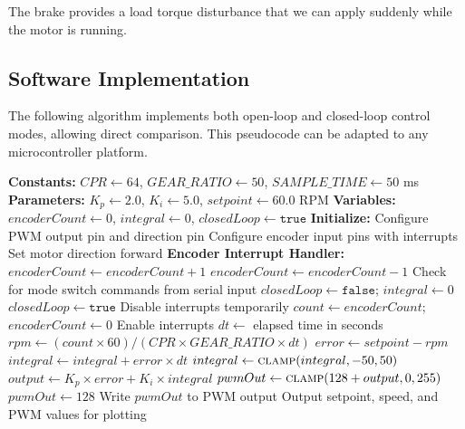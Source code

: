 The brake provides a load torque disturbance that we can apply suddenly while the motor is running.

\subsection{Software Implementation}

The following algorithm implements both open-loop and closed-loop control modes, allowing direct comparison. This pseudocode can be adapted to any microcontroller platform.

\begin{algorithm}
\caption{Motor Speed Control with Disturbance Rejection}
\begin{algorithmic}[1]
\State \textbf{Constants:} $CPR \gets 64$, $GEAR\_RATIO \gets 50$, $SAMPLE\_TIME \gets 50$ ms
\State \textbf{Parameters:} $K_p \gets 2.0$, $K_i \gets 5.0$, $setpoint \gets 60.0$ RPM
\State \textbf{Variables:} $encoderCount \gets 0$, $integral \gets 0$, $closedLoop \gets \texttt{true}$
\State
\State \textbf{Initialize:}
\State \hspace{1em} Configure PWM output pin and direction pin
\State \hspace{1em} Configure encoder input pins with interrupts
\State \hspace{1em} Set motor direction forward
\State
\State \textbf{Encoder Interrupt Handler:}
    \State $encoderCount \gets encoderCount + 1$
\Else
    \State $encoderCount \gets encoderCount - 1$
\EndIf
\State
{}
    \State Check for mode switch commands from serial input
        \State $closedLoop \gets \texttt{false}$; $integral \gets 0$
        \State $closedLoop \gets \texttt{true}$
    \EndIf
    \State
        \State Disable interrupts temporarily
        \State $count \gets encoderCount$; $encoderCount \gets 0$
        \State Enable interrupts
        \State $dt \gets$ elapsed time in seconds
        \State $rpm \gets (count \times 60) / (CPR \times GEAR\_RATIO \times dt)$
        \State
            \State $error \gets setpoint - rpm$
            \State $integral \gets integral + error \times dt$
            \State $integral \gets \Call{clamp}{integral, -50, 50}$
            \State $output \gets K_p \times error + K_i \times integral$
            \State $pwmOut \gets \Call{clamp}{128 + output, 0, 255}$
        \Else
            \State $pwmOut \gets 128$ 
        \EndIf
        \State
        \State Write $pwmOut$ to PWM output
        \State Output setpoint, speed, and PWM values for plotting
    \EndIf
\EndWhile
\end{algorithmic}
\end{algorithm}

